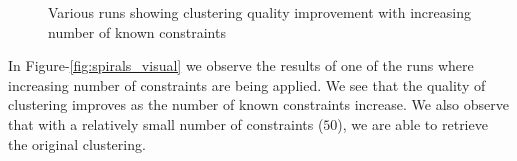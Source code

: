 \begin{figure}[p]
{\label{fig:spirals_cv_fold3}
}
\label{fig:spirals_cv}
\caption{Various runs showing clustering quality improvement with increasing number of known constraints}
\end{figure}

In Figure-\ref{fig:spirals_visual} we observe the results of one of the runs where increasing number of constraints are being applied. We see that the quality of clustering improves as the number of known constraints increase. We also observe that with a relatively small number of constraints ($50$), we are able to retrieve the original clustering.  

